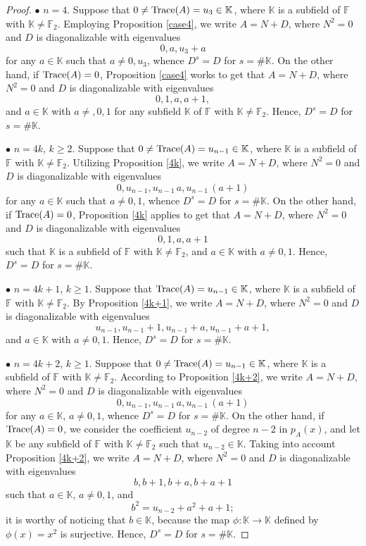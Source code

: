 \documentclass{amsart}
\def\FF{\mathbb{F}}
\def\KK{\mathbb{K}}
\theoremstyle{definition}
\theoremstyle{remark}
\numberwithin{equation}{section}
\begin{document}
\begin{proof}
\medskip

$\bullet$ $n=4$. Suppose that $0\ne {\rm Trace}(A)=u_3\in \KK$, where $\KK$ is a subfield of $\FF$ with $\KK\ne \FF_2$. Employing Proposition \ref{case4}, we write $A=N+D$, where $N^2=0$ and $D$ is diagonalizable with eigenvalues $$0, a, u_3+a$$ for any $a\in\KK$ such that $a\ne 0, u_3$, whence $D^s=D$ for $s=\#\KK$. On the other hand, if ${\rm Trace}(A)=0$, Proposition \ref{case4} works to get that $A=N+D$, where $N^2=0$ and $D$ is diagonalizable with eigenvalues $$0,1,a,a+1,$$ and $a\in \KK$ with $a\ne, 0,1$ for any subfield $\KK$ of $\FF$ with $\KK\ne \FF_2$. Hence, $D^s=D$ for $s=\#\KK$.

\medskip

$\bullet$ $n=4k$, $k\ge 2$. Suppose that $0\ne {\rm Trace}(A)=u_{n-1}\in \KK$, where $\KK$ is a subfield of $\FF$ with $\KK\ne \FF_2$. Utilizing Proposition \ref{4k}, we write $A=N+D$, where $N^2=0$ and $D$ is diagonalizable with eigenvalues $$0,u_{n-1}, u_{n-1}\,a, u_{n-1}\, (a+1)$$ for any $a\in\KK$ such that $a\ne 0,1$, whence $D^s=D$ for $s=\#\KK$. On the other hand, if ${\rm Trace}(A)=0$, Proposition \ref{4k} applies to get that $A=N+D$, where $N^2=0$ and $D$ is diagonalizable with eigenvalues $$0,1,a,a+1$$ such that $\KK$ is a subfield of $\FF$ with $\KK\ne \FF_2$, and $a\in \KK$ with $a\ne 0,1$. Hence, $D^s=D$ for $s=\#\KK$.

\medskip

$\bullet$ $n=4k+1$, $k\ge 1$. Suppose that ${\rm Trace}(A)=u_{n-1}\in \KK$, where $\KK$ is a subfield of $\FF$ with $\KK\ne \FF_2$. By Proposition \ref{4k+1}, we write $A=N+D$, where $N^2=0$ and $D$ is diagonalizable with eigenvalues $$u_{n-1}, u_{n-1}+1, u_{n-1}+a, u_{n-1}+a+1,$$ and $a\in \KK$ with $a\ne 0,1$. Hence, $D^s=D$ for $s=\#\KK$.

\medskip

$\bullet$ $n=4k+2$, $k\ge 1$. Suppose that $0\ne {\rm Trace}(A)=u_{n-1}\in \KK$, where $\KK$ is a subfield of $\FF$ with $\KK\ne \FF_2$. According to Proposition \ref{4k+2}, we write $A=N+D$, where $N^2=0$ and $D$ is diagonalizable with eigenvalues $$0,u_{n-1}, u_{n-1}\,a, u_{n-1}\, (a+1)$$ for any $a\in\KK$, $a\ne 0,1$, whence $D^s=D$ for $s=\#\KK$. On the other hand, if ${\rm Trace}(A)=0$, we consider the coefficient $u_{n-2}$ of degree $n-2$ in $p_{A}(x)$, and let $\KK$ be any subfield of $\FF$ with $\KK\ne \FF_2$ such that $u_{n-2}\in \KK$. Taking into account  Proposition \ref{4k+2}, we write $A=N+D$, where $N^2=0$ and $D$ is diagonalizable with eigenvalues $$b, b+1, b+a, b+a+1$$ such that $a\in \KK$, $a\ne 0,1$, and $$b^2=u_{n-2}+a^2+a+1;$$  it is worthy of noticing that $b\in \KK$, because the map $\phi:\KK\to \KK$ defined by $\phi(x)=x^2$ is surjective. Hence, $D^s=D$ for $s=\#\KK$.


\end{proof}
\end{document}
